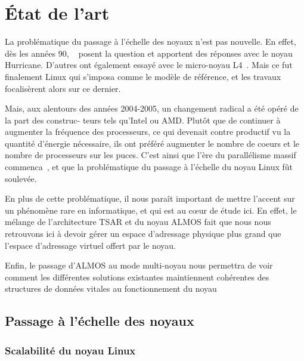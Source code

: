 \chapter{État de l’art}

  La problématique du passage à l’échelle des noyaux n’est pas nouvelle. En
  effet, dès les années 90, ~\citet{unrau1995hierarchical}
  posent la question et apportent des réponses avec le noyau Hurricane. D’autres
  ont également essayé avec le micro-noyau L4~\citep{}. Mais ce fut finalement
  Linux qui s’imposa comme le modèle de référence, et les travaux focalisèrent
  alors sur ce dernier.

  Mais, aux alentours des années 2004-2005, un changement radical a été opéré de
  la part des construc- teurs tels qu’Intel ou AMD. Plutôt que de continuer à
  augmenter la fréquence des processeurs, ce qui devenait contre productif vu la
  quantité d’énergie nécessaire, ils ont préféré augmenter le nombre de coeurs
  et le nombre de processeurs sur les puces. C’est ainsi que l’ère du
  parallélisme massif commenca~\citep{patterson2011parallel}, et que la
  problématique du passage à l’échelle du noyau Linux fût soulevée.

  En plus de cette problématique, il nous paraît important de mettre l’accent
  sur un phénomène rare en informatique, et qui est au cœur de étude ici. En
  effet, le mélange de l’architecture TSAR et du noyau ALMOS fait que nous nous
  retrouvons ici à devoir gérer un espace d’adressage physique plus grand que
  l’espace d’adressage virtuel offert par le noyau.

  Enfin, le passage d’ALMOS au mode multi-noyau nous permettra de voir comment
  les différentes solutions existantes maintiennent cohérentes des structures de
  données vitales au fonctionnement du noyau


  \section{Passage à l’échelle des noyaux}

    \subsection{Scalabilité du noyau Linux}

